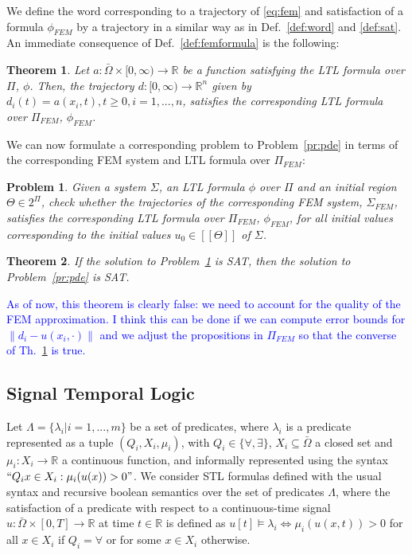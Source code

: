 \documentclass{article}
\newtheorem{theorem}{Theorem}
\newtheorem{problem}{Problem}
\newcommand*{\R}{\mathbb{R}}
\newcommand*{\psat}[1]{[[#1]]}
\newcommand*{\fran}[1]{\textcolor{blue}{#1}}
\begin{document}
We define the word corresponding to a trajectory of \eqref{eq:fem} and
satisfaction of a formula $\phi_{FEM}$ by a trajectory in a similar way as in
Def.~\ref{def:word} and \ref{def:sat}. An immediate consequence of
Def.~\ref{def:femformula} is the following:

\begin{theorem}\label{th:equiv}
    Let $a : \bar\Omega \times [0, \infty) \rightarrow \R$ be a function
    satisfying the LTL formula over $\Pi$, $\phi$. Then, the trajectory $d : [0,
    \infty) \rightarrow \R^n$ given by $d_i(t) = a(x_i, t), t \geq 0, i =
    1,...,n$, satisfies the corresponding LTL formula over $\Pi_{FEM}$, $\phi_{FEM}$.
\end{theorem}

We can now formulate a corresponding problem to Problem~\ref{pr:pde} in terms of 
the corresponding FEM system and LTL formula over $\Pi_{FEM}$:

\begin{problem}\label{pr:fem}
    Given a system $\Sigma$, an LTL formula $\phi$ over $\Pi$ and an initial
    region $\Theta \in 2^\Pi$, check whether the trajectories of the corresponding
    FEM system, $\Sigma_{FEM}$, satisfies the corresponding LTL formula over
    $\Pi_{FEM}$, $\phi_{FEM}$, for all initial values corresponding to the
    initial values $u_0 \in \psat{\Theta}$ of $\Sigma$.
\end{problem}

\begin{theorem}
    If the solution to Problem~\ref{pr:fem} is SAT, then the solution to
    Problem~\ref{pr:pde} is SAT.
\end{theorem}

\fran{As of now, this theorem is clearly false: we need to account for the
quality of the FEM approximation. I think this can be done if 
we can compute error bounds for $\|d_i - u(x_i, \cdot)\|$ and we adjust the
propositions in $\Pi_{FEM}$ so that the converse of Th.~\ref{th:equiv} is true.}

\subsection{Signal Temporal Logic}
\label{sub:signal_temporal_logic}

Let $\Lambda = \{\lambda_i | i = 1,...,m\}$ be a set of predicates, where
$\lambda_i$ is a predicate represented as a tuple $(Q_i, X_i, \mu_i)$, with $Q_i
\in \{\forall, \exists\}$, $X_i
\subseteq \bar\Omega$ a closed set and $\mu_i : X_i \to \R$ a continuous function,
and informally represented using the syntax $``Q_i x \in X_i : \mu_i(u(x)) >
0"$. We consider STL formulas defined with the usual syntax and recursive boolean
semantics over the set of predicates $\Lambda$, where the satisfaction of a
predicate with respect to a continuous-time signal $u : \bar\Omega \times [0, T]
\to \R$ at time $t \in \R$ is defined as $u[t] \models \lambda_i \iff 
\mu_i(u(x, t)) > 0$ for all $x \in X_i$ if $Q_i = \forall$ or for some $x \in
X_i$ otherwise.
\end{document}

